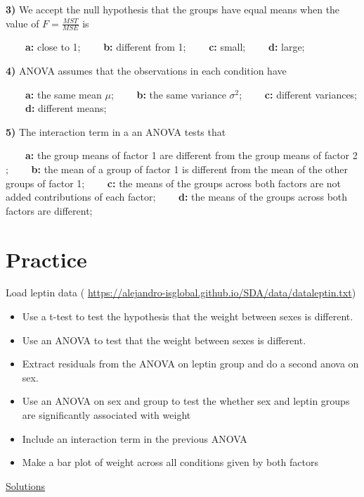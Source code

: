 \documentclass[
]{book}
\begin{document}
\textbf{3)} We accept the null hypothesis that the groups have equal means when the value of \(F=\frac{MST}{MSE}\) is

\textbf{\(\qquad\)a:} close to 1;
\textbf{\(\qquad\)b:} different from 1;
\textbf{\(\qquad\)c:} small;
\textbf{\(\qquad\)d:} large;

\textbf{4)} ANOVA assumes that the observations in each condition have

\textbf{\(\qquad\)a:} the same mean \(\mu\);
\textbf{\(\qquad\)b:} the same variance \(\sigma^2\);
\textbf{\(\qquad\)c:} different variances;
\textbf{\(\qquad\)d:} different means;

\textbf{5)} The interaction term in a an ANOVA tests that

\textbf{\(\qquad\)a:} the group means of factor 1 are different from the group means of factor 2 ;
\textbf{\(\qquad\)b:} the mean of a group of factor 1 is different from the mean of the other groups of factor 1;
\textbf{\(\qquad\)c:} the means of the groups across both factors are not added contributions of each factor;
\textbf{\(\qquad\)d:} the means of the groups across both factors are different;

\hypertarget{practice-7}{%
\section{Practice}\label{practice-7}}

Load leptin data (
\url{https://alejandro-isglobal.github.io/SDA/data/dataleptin.txt})

\begin{itemize}
\item
  Use a t-test to test the hypothesis that the weight between sexes is different.
\item
  Use an ANOVA to test that the weight between sexes is different.
\item
  Extract residuals from the ANOVA on leptin group and do a second anova on sex.
\item
  Use an ANOVA on sex and group to test the whether sex and leptin groups are significantly associated with weight
\item
  Include an interaction term in the previous ANOVA
\item
  Make a bar plot of weight across all conditions given by both factors
\end{itemize}

\href{https://colab.research.google.com/drive/1K2SlNEd5hNn3lI4XnKsgj1tDeXVyprVE?usp=sharing}{Solutions}
\end{document}
